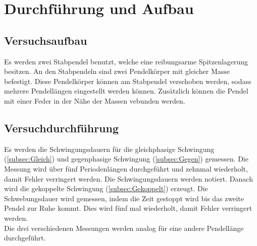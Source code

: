 \section{Durchführung und Aufbau}
\label{sec:Durchführung}
\subsection{Versuchsaufbau} %
\label{sub:Versuchsaufbau}
Es werden zwei Stabpendel benutzt, welche eine reibungsarme Spitzenlagerung besitzen.
An den Stabpendeln sind zwei Pendelkörper mit gleicher Masse befestigt.
Diese Pendelkörper können am Stabpendel verschoben werden, sodass mehrere Pendellängen eingestellt werden können.
Zusätzlich können die Pendel mit einer Feder in der Nähe der Massen vebunden werden.

\subsection{Versuchdurchführung} %
\label{sub:Versuchdurchführung}
Es werden die Schwingungsdauern für die gleichphasige Schwingung (\autoref{subsec:Gleich}) und gegenphasige Schwingung (\autoref{subsec:Gegen}) gemessen.
Die Messung wird über fünf Periodenlängen durchgeführt und zehnmal wiederholt, damit Fehler verringert werden.
Die Schwingungsdauern werden notiert.
Danach wird die gekoppelte Schwingung (\autoref{subsec:Gekoppelt}) erzeugt.
Die Schwebungsdauer wird gemessen, indem die Zeit gestoppt wird bis das zweite Pendel zur Ruhe kommt. 
Dies wird fünf mal wiederholt, damit Fehler verringert werden. \\
Die drei verschiedenen Messungen werden analog für eine andere Pendellänge durchgeführt.


